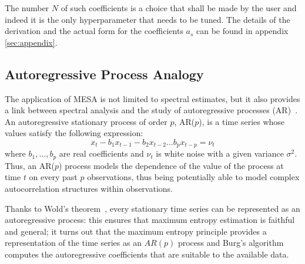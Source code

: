\documentclass{aa}
\begin{document}
The number $N$ of such coefficients is a choice that shall be made by the user and indeed it is the only hyperparameter that needs to be tuned. The details of the derivation and the actual form for the coefficients $a_s$ can be found in appendix \ref{sec:appendix}.

\subsection{Autoregressive Process Analogy} \label{sec:autoregr}

The application of MESA is not limited to spectral estimates, but it also provides a link between spectral analysis and the study
of autoregressive processes (AR)~\citep{doi:10.1029/RG013i001p00183}.
An autoregressive stationary process of order $p$, AR($p$), is a time series whose values satisfy the following expression: 
\begin{equation} \label{eq:AR_p}
    x_t - b_1 x_{t-1} - b_2 x_{t-2} \dots b_p x_{t - p} = \nu_t
\end{equation}
where $b_1, \ldots, b_p$ are real coefficients and $\nu_t$ is white noise with a given variance $\sigma^2$.
Thus, an AR($p$) process models the dependence of the value of the process at time $t$ on every past $p$ observations, 
thus being potentially able to model complex autocorrelation structures within observations.

Thanks to Wold's theorem~\citep{Wold_theorem}, every stationary time series can be represented as an autoregressive process: this ensures that maximum entropy estimation is faithful and general; it turns out that the maximum entropy principle provides a representation of the time series as an $AR(p)$ process and Burg's algorithm computes the autoregressive coefficients that are suitable to the available data.
\end{document}
